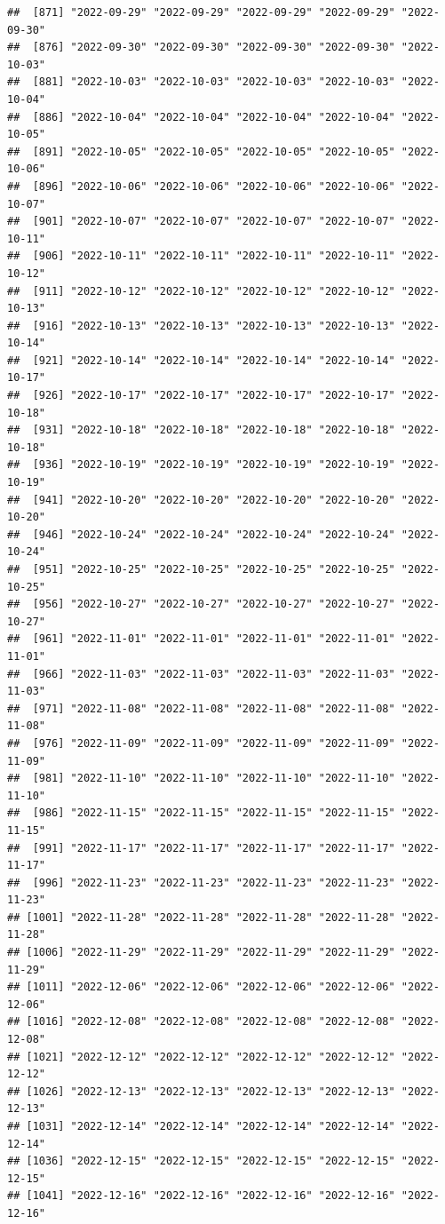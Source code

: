 \documentclass[
]{article}
\begin{document}
\begin{verbatim}
##  [871] "2022-09-29" "2022-09-29" "2022-09-29" "2022-09-29" "2022-09-30"
##  [876] "2022-09-30" "2022-09-30" "2022-09-30" "2022-09-30" "2022-10-03"
##  [881] "2022-10-03" "2022-10-03" "2022-10-03" "2022-10-03" "2022-10-04"
##  [886] "2022-10-04" "2022-10-04" "2022-10-04" "2022-10-04" "2022-10-05"
##  [891] "2022-10-05" "2022-10-05" "2022-10-05" "2022-10-05" "2022-10-06"
##  [896] "2022-10-06" "2022-10-06" "2022-10-06" "2022-10-06" "2022-10-07"
##  [901] "2022-10-07" "2022-10-07" "2022-10-07" "2022-10-07" "2022-10-11"
##  [906] "2022-10-11" "2022-10-11" "2022-10-11" "2022-10-11" "2022-10-12"
##  [911] "2022-10-12" "2022-10-12" "2022-10-12" "2022-10-12" "2022-10-13"
##  [916] "2022-10-13" "2022-10-13" "2022-10-13" "2022-10-13" "2022-10-14"
##  [921] "2022-10-14" "2022-10-14" "2022-10-14" "2022-10-14" "2022-10-17"
##  [926] "2022-10-17" "2022-10-17" "2022-10-17" "2022-10-17" "2022-10-18"
##  [931] "2022-10-18" "2022-10-18" "2022-10-18" "2022-10-18" "2022-10-18"
##  [936] "2022-10-19" "2022-10-19" "2022-10-19" "2022-10-19" "2022-10-19"
##  [941] "2022-10-20" "2022-10-20" "2022-10-20" "2022-10-20" "2022-10-20"
##  [946] "2022-10-24" "2022-10-24" "2022-10-24" "2022-10-24" "2022-10-24"
##  [951] "2022-10-25" "2022-10-25" "2022-10-25" "2022-10-25" "2022-10-25"
##  [956] "2022-10-27" "2022-10-27" "2022-10-27" "2022-10-27" "2022-10-27"
##  [961] "2022-11-01" "2022-11-01" "2022-11-01" "2022-11-01" "2022-11-01"
##  [966] "2022-11-03" "2022-11-03" "2022-11-03" "2022-11-03" "2022-11-03"
##  [971] "2022-11-08" "2022-11-08" "2022-11-08" "2022-11-08" "2022-11-08"
##  [976] "2022-11-09" "2022-11-09" "2022-11-09" "2022-11-09" "2022-11-09"
##  [981] "2022-11-10" "2022-11-10" "2022-11-10" "2022-11-10" "2022-11-10"
##  [986] "2022-11-15" "2022-11-15" "2022-11-15" "2022-11-15" "2022-11-15"
##  [991] "2022-11-17" "2022-11-17" "2022-11-17" "2022-11-17" "2022-11-17"
##  [996] "2022-11-23" "2022-11-23" "2022-11-23" "2022-11-23" "2022-11-23"
## [1001] "2022-11-28" "2022-11-28" "2022-11-28" "2022-11-28" "2022-11-28"
## [1006] "2022-11-29" "2022-11-29" "2022-11-29" "2022-11-29" "2022-11-29"
## [1011] "2022-12-06" "2022-12-06" "2022-12-06" "2022-12-06" "2022-12-06"
## [1016] "2022-12-08" "2022-12-08" "2022-12-08" "2022-12-08" "2022-12-08"
## [1021] "2022-12-12" "2022-12-12" "2022-12-12" "2022-12-12" "2022-12-12"
## [1026] "2022-12-13" "2022-12-13" "2022-12-13" "2022-12-13" "2022-12-13"
## [1031] "2022-12-14" "2022-12-14" "2022-12-14" "2022-12-14" "2022-12-14"
## [1036] "2022-12-15" "2022-12-15" "2022-12-15" "2022-12-15" "2022-12-15"
## [1041] "2022-12-16" "2022-12-16" "2022-12-16" "2022-12-16" "2022-12-16"

\end{verbatim}
\end{document}
